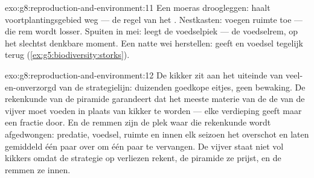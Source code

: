 \begin{solution}{exo:g8:reproduction-and-environment:11}
Een moeras droogleggen: haalt voortplantingsgebied weg --- de regel van
het . Nestkasten: voegen ruimte toe --- die rem wordt losser.
Spuiten in mei: leegt de voedselpiek --- de voedselrem, op het slechtst
denkbare moment. Een natte wei herstellen: geeft  en voedsel
tegelijk terug (\cref{ex:g5:biodiversity:storks}).
\end{solution}

\begin{solution}{exo:g8:reproduction-and-environment:12}
De kikker zit aan het uiteinde van veel-en-onverzorgd van de strategielijn:
duizenden goedkope eitjes, geen bewaking. De rekenkunde van de piramide
garandeert dat het meeste materie van de  de  van
de vijver moet voeden in plaats van kikker te worden --- elke verdieping
geeft maar een fractie door. En de remmen zijn de plek waar die rekenkunde
wordt afgedwongen: predatie, voedsel, ruimte en  innen elk
seizoen het overschot en laten gemiddeld één paar over om één paar te
vervangen. De vijver staat niet vol kikkers omdat de strategie op
verliezen rekent, de piramide ze prijst, en de remmen ze innen.
\end{solution}

